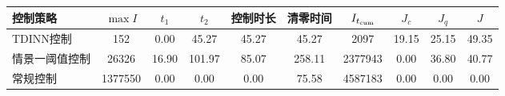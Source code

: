 \begin{tabular}{lccccccccc}
\toprule
控制策略 & $\max I$ & $t_1$ & $t_2$ & 控制时长 & 清零时间 & $I_{t_{\rm cum}}$ & $J_c$ & $J_q$ & $J$ \\
\midrule
TDINN控制 & 152 & 0.00 & 45.27 & 45.27 & 45.27 & 2097 & 19.15 & 25.15 & 49.35 \\
情景一阈值控制 & 26326 & 16.90 & 101.97 & 85.07 & 258.11 & 2377943 & 0.00 & 36.80 & 40.77 \\
常规控制 & 1377550 & 0.00 & 0.00 & 0.00 & 75.58 & 4587183 & 0.00 & 0.00 & 0.00 \\
\bottomrule
\end{tabular}

